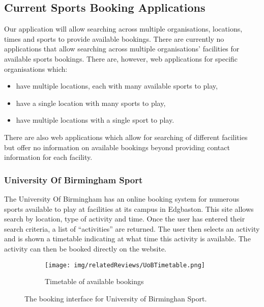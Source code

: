 \subsection{Current Sports Booking Applications}
\label{sub:current_sports_booking_applications}

Our application will allow searching across multiple organisations, locations,
times and sports to provide available bookings. There are currently no
applications that allow searching across multiple organisations' facilities for
available sports bookings. There are, however, web applications for specific
organisations which:
\begin{itemize}
	\item have multiple locations, each with many available sports to play,
	\item have a single location with many sports to play,
	\item have multiple locations with a single sport to play.
\end{itemize}
There are also web applications which allow for searching of different
facilities but offer no information on available bookings beyond providing
contact information for each facility.

\subsubsection{University Of Birmingham Sport}
\label{ssub:university_of_birmingham_sport}

The University Of Birmingham has an online booking system for numerous sports
available to play at facilities at its campus in Edgbaston\cite{UOBSport}. This
site allows search by location, type of activity and time. Once the user has
entered their search criteria, a list of ``activities'' are returned. The user
then selects an activity and is shown a timetable indicating at what time this
activity is available. The activity can then be booked directly on the website.
\begin{figure}[htbp]
	\centering
	\checkoddpage%
	\edef\side{\ifoddpage l\else r\fi}%
	\smallskip
	\begin{subfigure}[b]{\textwidth}
		\texttt{[image: img/relatedReviews/UoBTimetable.png]}
		\caption{Timetable of available bookings}\label{fig:UoBTimetable}
	\end{subfigure}
	\caption{The booking interface for University of Birminghan Sport.
	}\label{fig:animals}
\end{figure}

